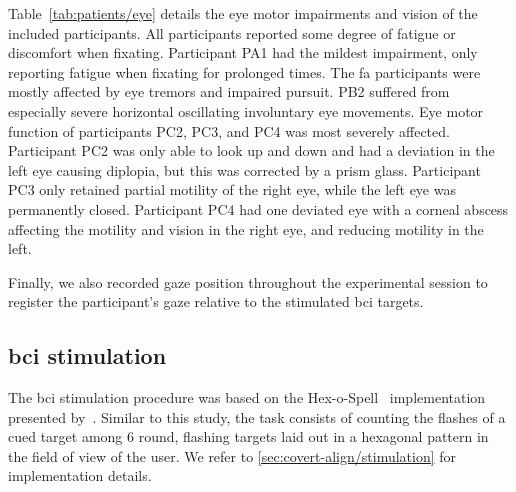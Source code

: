 Table~\ref{tab:patients/eye} details the eye motor impairments and vision of
the included participants.
All participants reported some degree of fatigue or discomfort when fixating.
Participant PA1 had the mildest impairment, only reporting fatigue when fixating
for prolonged times.
The \ac{fa} participants were mostly affected by eye tremors and impaired pursuit.
PB2 suffered from especially severe horizontal oscillating involuntary eye
movements.
Eye motor function of participants PC2, PC3, and PC4 was most severely affected.
Participant PC2 was only able to look up and down and had a deviation in the
left eye causing diplopia, but this was corrected by a prism glass.
Participant PC3 only retained partial motility of the right eye, while the left eye was permanently closed.
Participant PC4 had one deviated eye with a corneal abscess affecting the motility
and vision in the right eye, and reducing motility in the left.

\begin{table}[t]
  \centering
  \footnotesize
  
  \caption[Visual skills of the included participants.]{%
  Visual skills of the included participants.
  Visual~\ac{bci} skills~\cite{FriedOken2020}
  were assessed with a combination of self-reported issues
  by the subject and the NeuroEye~\cite{Hassan2022} test. \BigCross\
  impaired, \BigDiamondshape\ severely impaired.
  logMAR: lower is better.}
  \label{tab:patients/eye}
\end{table}

Finally, we also recorded gaze position throughout the experimental session to
register the participant's gaze relative to the stimulated \ac{bci} targets.

\subsection{\Acs{bci} stimulation}

The \ac{bci} stimulation procedure was based on the
Hex-o-Spell~\cite{Treder2010} implementation presented
by~\textcite{VanDenKerchove2024}.
Similar to this study, the task consists of counting the flashes of a cued
target among 6 round, flashing targets laid out in a hexagonal pattern in the
field of view of the user.
We refer to \cref{sec:covert-align/stimulation} for implementation details.

